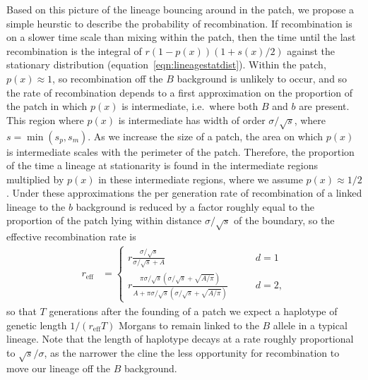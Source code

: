 \documentclass{article}
\newcommand{\plr}[1]{{\it\color{blue}(#1)}}
\begin{document}
Based on this picture of
the lineage bouncing around in the patch,
we propose a simple heurstic to describe the probability of recombination. 
If recombination is on a slower time scale than mixing within the patch,
then the time until the last recombination is the integral of $r (1-p(x)) (1+s(x)/2)$ 
against the stationary distribution (equation~\ref{eqn:lineagestatdist}).
Within the patch, $p(x) \approx 1$,
so recombination off the $B$ background is unlikely to occur,
and so the rate of recombination depends to a first approximation 
on the proportion of the patch in which $p(x)$ is intermediate,
i.e.\ where both $B$ and $b$ are present.
This region where $p(x)$ is intermediate has width of order $\sigma/\sqrt{s}$, where $s = \min(s_p,s_m)$.
As we increase the size of a patch, the area on which $p(x)$ is intermediate scales with the perimeter of the patch.
Therefore, the proportion of the time a lineage at stationarity is found in the intermediate regions
multiplied by $p(x)$ in these intermediate regions, where we assume
$p(x) \approx 1/2$. Under these approximations the per generation rate of
recombination of a linked lineage to the $b$ background is
reduced by a factor roughly equal to the proportion of the patch lying within distance $\sigma/\sqrt{s}$ of the boundary,
so the effective recombination rate is
\begin{align}
r_\text{eff} &=
    \begin{cases}
    r \frac{ \sigma /\sqrt{s} }{ \sigma/\sqrt{s} + A }    \qquad & d=1 \\
   r \frac{\pi  \sigma /\sqrt{s}  \left( \sigma /\sqrt{s}+
  \sqrt{A/\pi} \right)}{A+\pi \sigma/\sqrt{s} \left( \sigma/\sqrt{s} +
  \sqrt{A/\pi} \right) }    \qquad & d=2 ,  
\end{cases}
\label{eqn:rec_rate_within}   %
\end{align}
so that $T$ generations after the founding of a patch we expect a
haplotype of genetic length $1/(r_\text{eff}T)$ Morgans to remain linked to
the $B$ allele in a typical lineage. 
Note that the length of haplotype
decays at a rate roughly proportional to $\sqrt{s}/ \sigma$, as the narrower the cline the less
opportunity for recombination to move our lineage off the $B$ background. 
 
\end{document}
